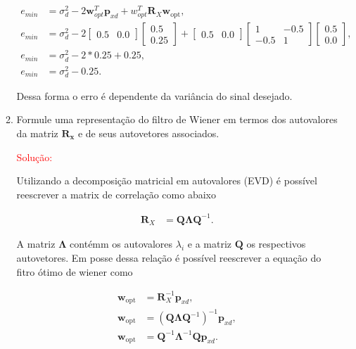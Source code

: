 \documentclass[a4paper,10pt]{article}
\begin{document}
\begin{enumerate}
\begin{enumerate}
						\begin{align}
							e_{min}  &=\sigma^{2}_{d} - 2\mathbf{w}^{T}_{opt}\mathbf{p}_{xd} + w^{T}_{opt}\mathbf{R}_{X}\mathbf{w}_{\text{opt}}, \\
							e_{min} &= \sigma^{2}_{d} - 2 \left[ \begin{matrix} 0.5 & 0.0 \end{matrix} \right] \left[ \begin{matrix} 0.5 \\ 0.25 \end{matrix} \right] + \left[ \begin{matrix} 0.5 & 0.0 \end{matrix} \right] \left[ \begin{matrix} 1 & -0.5 \\ -0.5 & 1 \end{matrix} \right]  \left[ \begin{matrix} 0.5  \\ 0.0 \end{matrix} \right], \\
							e_{min} &= \sigma^{2}_{d} - 2 * 0.25 + 0.25, \\
							e_{min} &= \sigma^{2}_{d} - 0.25. 
						\end{align}
						
						Dessa forma o erro é dependente da variância do sinal desejado.					
					
					\item Formule uma representação do filtro de Wiener em termos dos autovalores da matriz $\mathbf{R}_{\mathbf{x}}$
					e de seus autovetores associados.
					
						\textcolor{red}{Solução:}
						
						Utilizando a decomposição matricial em autovalores (EVD) é possível reescrever a matrix de correlação como abaixo
						
						\begin{align}
							\mathbf{R}_{X} &= \mathbf{Q} \mathbf{\Lambda} \mathbf{Q}^{-1}.
						\end{align}
						
						A matriz $\mathbf{\Lambda}$ contémm os autovalores $\lambda_{i}$ e a matriz $\mathbf{Q}$ os respectivos autovetores. Em posse dessa relação é possível reescrever a equação do fitro ótimo de wiener como
						
						\begin{align}
							\mathbf{w}_{\text{opt}} &= \mathbf{R}^{-1}_{X} \mathbf{p}_{xd}, \\
							\mathbf{w}_{\text{opt}} &= (\mathbf{Q} \mathbf{\Lambda} \mathbf{Q}^{-1})^{-1} \mathbf{p}_{xd}, \\
							\mathbf{w}_{\text{opt}} &= \mathbf{Q}^{-1} \mathbf{\Lambda}^{-1} \mathbf{Q} \mathbf{p}_{xd}.
						\end{align}
						

\end{enumerate}
\end{enumerate}
\end{document}
